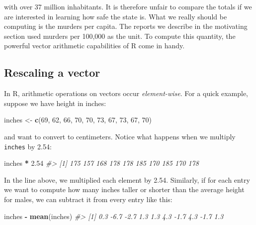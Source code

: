 \documentclass[
]{krantz}
\newenvironment{Shaded}{\begin{snugshade}}{\end{snugshade}}
\newcommand{\CommentTok}[1]{\textcolor[rgb]{0.37,0.37,0.37}{\textit{#1}}}
\newcommand{\DecValTok}[1]{\textcolor[rgb]{0.06,0.06,0.06}{#1}}
\newcommand{\FloatTok}[1]{\textcolor[rgb]{0.06,0.06,0.06}{#1}}
\newcommand{\KeywordTok}[1]{\textcolor[rgb]{0.27,0.27,0.27}{\textbf{#1}}}
\newcommand{\NormalTok}[1]{#1}
\newcommand{\OperatorTok}[1]{\textcolor[rgb]{0.43,0.43,0.43}{\textbf{#1}}}
\newcommand{\StringTok}[1]{\textcolor[rgb]{0.5,0.5,0.5}{#1}}
\begin{document}
with over 37 million inhabitants. It is therefore unfair to compare the totals if we are interested in learning how safe the state is. What we really should be computing is the murders per capita. The reports we describe in the motivating section used murders per 100,000 as the unit. To compute this quantity, the powerful vector arithmetic capabilities of R come in handy.

\hypertarget{rescaling-a-vector}{%
\subsection{Rescaling a vector}\label{rescaling-a-vector}}

In R, arithmetic operations on vectors occur \emph{element-wise}. For a quick example, suppose we have height in inches:

\begin{Shaded}
\begin{Highlighting}[]
\NormalTok{inches <-}\StringTok{ }\KeywordTok{c}\NormalTok{(}\DecValTok{69}\NormalTok{, }\DecValTok{62}\NormalTok{, }\DecValTok{66}\NormalTok{, }\DecValTok{70}\NormalTok{, }\DecValTok{70}\NormalTok{, }\DecValTok{73}\NormalTok{, }\DecValTok{67}\NormalTok{, }\DecValTok{73}\NormalTok{, }\DecValTok{67}\NormalTok{, }\DecValTok{70}\NormalTok{)}
\end{Highlighting}
\end{Shaded}

and want to convert to centimeters. Notice what happens when we multiply \texttt{inches} by 2.54:

\begin{Shaded}
\begin{Highlighting}[]
\NormalTok{inches }\OperatorTok{*}\StringTok{ }\FloatTok{2.54}
\CommentTok{#>  [1] 175 157 168 178 178 185 170 185 170 178}
\end{Highlighting}
\end{Shaded}

In the line above, we multiplied each element by 2.54. Similarly, if for each entry we want to compute how many inches taller or shorter than the average height for males, we can subtract it from every entry like this:

\begin{Shaded}
\begin{Highlighting}[]
\NormalTok{inches }\OperatorTok{-}\StringTok{ }\KeywordTok{mean}\NormalTok{(inches)}
\CommentTok{#>  [1]  0.3 -6.7 -2.7  1.3  1.3  4.3 -1.7  4.3 -1.7  1.3}
\end{Highlighting}
\end{Shaded}
\end{document}
